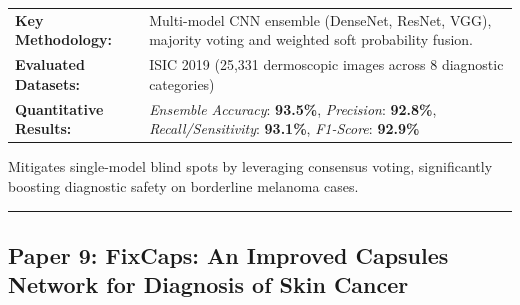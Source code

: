 \documentclass[10pt,a4paper]{article}
\begin{document}
\vspace{4pt}
\begin{tabularx}{\linewidth}{p{3.2cm}X}
\toprule
\textbf{Key Methodology:} & Multi-model CNN ensemble (DenseNet, ResNet, VGG), majority voting and weighted soft probability fusion. \\
\textbf{Evaluated Datasets:} & ISIC 2019 (25,331 dermoscopic images across 8 diagnostic categories) \\
\textbf{Quantitative Results:} & \textit{Ensemble Accuracy}: \textbf{93.5\%}, \textit{Precision}: \textbf{92.8\%}, \textit{Recall/Sensitivity}: \textbf{93.1\%}, \textit{F1-Score}: \textbf{92.9\%} \\
\bottomrule
\end{tabularx}
\vspace{4pt}
\begin{tcolorbox}[utilitybox,title=Clinical Utility and Real-World Impact]
Mitigates single-model blind spots by leveraging consensus voting, significantly boosting diagnostic safety on borderline melanoma cases.
\end{tcolorbox}
\vspace{12pt}
\hrule
\vspace{12pt}
\subsection*{Paper 9: FixCaps: An Improved Capsules Network for Diagnosis of Skin Cancer}
\end{document}
